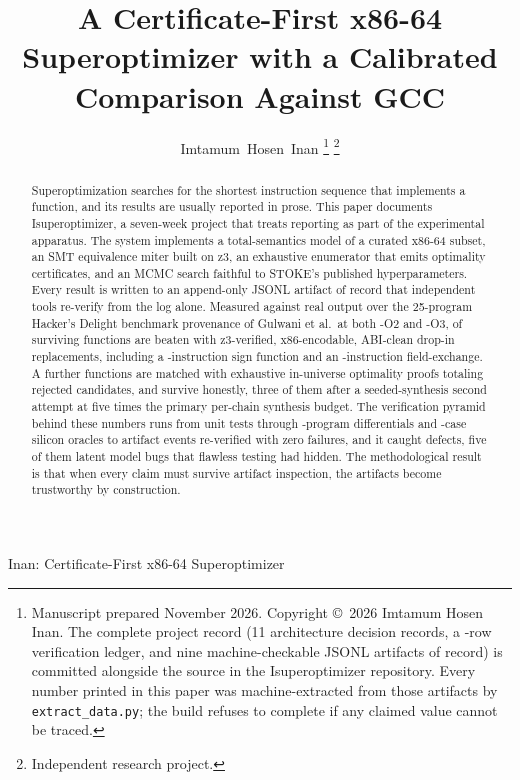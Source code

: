 \documentclass[journal,10pt]{IEEEtran}
\begin{document}
\title{A Certificate-First x86-64 Superoptimizer with a Calibrated
Comparison Against GCC}

\author{Imtamum~Hosen~Inan%
\thanks{Manuscript prepared November 2026. Copyright \copyright\ 2026
Imtamum Hosen Inan. The complete project record (11 architecture
decision records, a \NumLedgerRows{}-row verification ledger, and nine
machine-checkable JSONL artifacts of record) is committed alongside the
source in the Isuperoptimizer repository. Every number printed in this
paper was machine-extracted from those artifacts by
\texttt{extract\_data.py}; the build refuses to complete if any claimed
value cannot be traced.}%
\thanks{Independent research project.}}

%
{Inan: Certificate-First x86-64 Superoptimizer}

\maketitle

\begin{abstract}
Superoptimization searches for the shortest instruction sequence that
implements a function, and its results are usually reported in prose.
This paper documents Isuperoptimizer, a seven-week project that treats
reporting as part of the experimental apparatus. The system implements
a total-semantics model of a curated x86-64 subset, an SMT equivalence
miter built on z3, an exhaustive enumerator that emits optimality
certificates, and an MCMC search faithful to STOKE's published
hyperparameters. Every result is written to an append-only JSONL
artifact of record that independent tools re-verify from the log alone.
Measured against real \CompilerVersion{} output over the 25-program
Hacker's Delight benchmark provenance of Gulwani et al.\ at both
\mbox{-O2} and \mbox{-O3}, \NumBeaten{} of \NumFunctions{} surviving
functions are beaten with z3-verified, x86-encodable, ABI-clean drop-in
replacements, including a \OursLenPthirteen-instruction sign function
and an \OursLenPnineteen-instruction field-exchange. A further
\NumMatched{} functions are matched with exhaustive in-universe
optimality proofs totaling \TotalCandidates{} rejected candidates, and
\NumHonest{} survive honestly, three of them after a seeded-synthesis
second attempt at five times the primary per-chain synthesis budget.
The verification pyramid behind these numbers runs from \NumTests{}
unit tests through \BulkPrograms{}-program differentials and
\HwCases{}-case silicon oracles to \RecheckTotal{} artifact events
re-verified with zero failures, and it caught \NumLedgerRows{} defects,
five of them latent model bugs that flawless testing had hidden. The
methodological result is that when every claim must survive artifact
inspection, the artifacts become trustworthy by construction.
\end{abstract}
\end{document}
